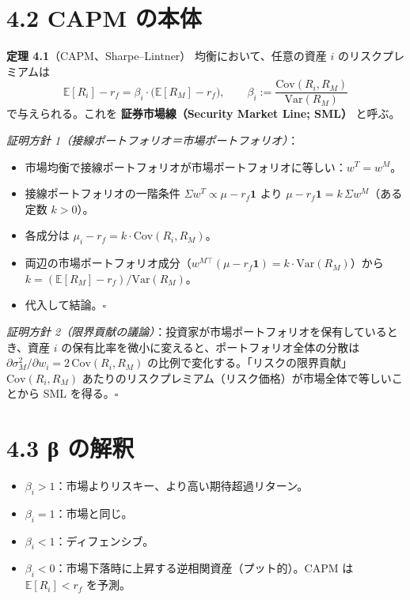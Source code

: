 \documentclass[11pt,a4paper]{report}
\begin{document}
\section{4.2 CAPM の本体}

\textbf{定理 4.1}（CAPM、Sharpe–Lintner） 均衡において、任意の資産 $i$ のリスクプレミアムは \[ \boxed{\; \mathbb{E}[R_i] - r_f = \beta_i \cdot \big(\mathbb{E}[R_M] - r_f\big),\qquad \beta_i := \frac{\mathrm{Cov}(R_i, R_M)}{\mathrm{Var}(R_M)} \;} \] で与えられる。これを \textbf{証券市場線（Security Market Line; SML）} と呼ぶ。

\emph{証明方針 1（接線ポートフォリオ＝市場ポートフォリオ）}：
\begin{itemize}
\item 市場均衡で接線ポートフォリオが市場ポートフォリオに等しい：$w^T = w^M$。
\item 接線ポートフォリオの一階条件 $\Sigma w^T \propto \mu - r_f\mathbf{1}$ より $\mu - r_f \mathbf{1} = k\, \Sigma w^M$（ある定数 $k>0$）。
\item 各成分は $\mu_i - r_f = k \cdot \mathrm{Cov}(R_i, R_M)$。
\item 両辺の市場ポートフォリオ成分（$w^{M\top}(\mu - r_f\mathbf{1}) = k \cdot \mathrm{Var}(R_M)$）から $k = (\mathbb{E}[R_M] - r_f)/\mathrm{Var}(R_M)$。
\item 代入して結論。$\square$
\end{itemize}

\emph{証明方針 2（限界貢献の議論）}：投資家が市場ポートフォリオを保有しているとき、資産 $i$ の保有比率を微小に変えると、ポートフォリオ全体の分散は $\partial \sigma_M^2 / \partial w_i = 2\, \mathrm{Cov}(R_i, R_M)$ の比例で変化する。「リスクの限界貢献」 $\mathrm{Cov}(R_i, R_M)$ あたりのリスクプレミアム（リスク価格）が市場全体で等しいことから SML を得る。$\square$

\section{4.3 β の解釈}

\begin{itemize}
\item $\beta_i > 1$：市場よりリスキー、より高い期待超過リターン。
\item $\beta_i = 1$：市場と同じ。
\item $\beta_i < 1$：ディフェンシブ。
\item $\beta_i < 0$：市場下落時に上昇する逆相関資産（プット的）。CAPM は $\mathbb{E}[R_i] < r_f$ を予測。
\end{itemize}
\end{document}
